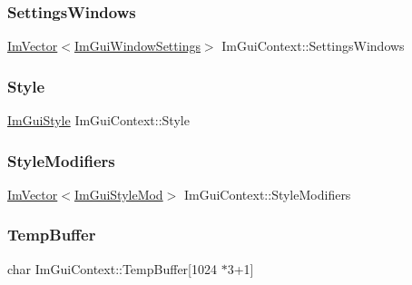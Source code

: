 \hypertarget{struct_im_gui_context_a19273d7eb5a729463c042671ae27ca58}{}\label{struct_im_gui_context_a19273d7eb5a729463c042671ae27ca58} 
\subsubsection{\texorpdfstring{Settings\+Windows}{SettingsWindows}}
{\footnotesize\ttfamily \hyperlink{class_im_vector}{Im\+Vector}$<$\hyperlink{struct_im_gui_window_settings}{Im\+Gui\+Window\+Settings}$>$ Im\+Gui\+Context\+::\+Settings\+Windows}

\hypertarget{struct_im_gui_context_a2e682502e1a3d2c399171dd3c4fc969d}{}\label{struct_im_gui_context_a2e682502e1a3d2c399171dd3c4fc969d} 
\subsubsection{\texorpdfstring{Style}{Style}}
{\footnotesize\ttfamily \hyperlink{struct_im_gui_style}{Im\+Gui\+Style} Im\+Gui\+Context\+::\+Style}

\hypertarget{struct_im_gui_context_ac0feba14c36c7dff87211c3650815be7}{}\label{struct_im_gui_context_ac0feba14c36c7dff87211c3650815be7} 
\subsubsection{\texorpdfstring{Style\+Modifiers}{StyleModifiers}}
{\footnotesize\ttfamily \hyperlink{class_im_vector}{Im\+Vector}$<$\hyperlink{struct_im_gui_style_mod}{Im\+Gui\+Style\+Mod}$>$ Im\+Gui\+Context\+::\+Style\+Modifiers}

\hypertarget{struct_im_gui_context_a875033fc5c10bc1e050f8701055ae93b}{}\label{struct_im_gui_context_a875033fc5c10bc1e050f8701055ae93b} 
\subsubsection{\texorpdfstring{Temp\+Buffer}{TempBuffer}}
{\footnotesize\ttfamily char Im\+Gui\+Context\+::\+Temp\+Buffer\mbox{[}1024 $\ast$3+1\mbox{]}}

